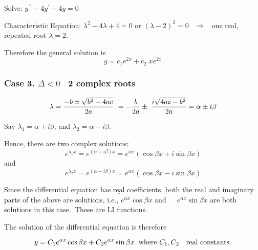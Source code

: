   \begin{frame}
 \begin{example}
 Solve:  $y^{\prime \prime }-4y^{\prime }+4y=0$
 \end{example}
 
 Characteristic Equation: $\lambda ^{2}-4\lambda +4=0$ \pause  or $(\lambda -2)^{2}=0$ \ \pause  $%
 \Rightarrow $ \ one real, repeated root $\lambda =2$. \pause 
 
Therefore the general solution is
 \begin{equation*}
 \ y=c_{1}e^{2x}+c_{2}\;xe^{2x}.
 \end{equation*}
 
 \end{frame}
 
 
 
 \begin{frame} 
\frametitle{Case 3. $\Delta <0$ \ 2 complex roots} 
 
 \begin{equation*}
 \lambda =\frac{-b\pm \sqrt{b^{2}-4ac}}{2a}\ =-\frac{b}{2a}\pm \;\frac{i\sqrt{%
 4ac-b^{2}}}{2a} = \alpha \pm i\beta 
 \end{equation*}
 
Say $ \lambda_1=\alpha + i \beta$, and  $ \lambda_2=\alpha - i \beta$.
\\ \vsp 
 
Hence, there are two complex solutions: \\
 \[e^{\lambda_1x} =e^{(\alpha +i\beta )x} =e^{\alpha x}(\cos \beta x+i\sin \beta x)\] 
 and 
 \[
e^{\lambda_2x} = e^{(\alpha -i\beta
  )x}=e^{\alpha x}(\cos \beta x-i\sin \beta x)
 \]
\pause
 
 Since the differential equation has $\underline{\text{real}}$ coefficients, both the real and imaginary parts of the above are solutions, i.e.,
  $e^{\alpha x}\cos \beta x$ and\ \ \ $e^{\alpha x}\sin \beta x$ are both
  solutions in this case.\ These are LI functions.
   \end{frame}
  
  
  
  \begin{frame}
 
 
 The solution of the differential equation is therefore
 
 \begin{equation*}
 y=C_1e^{\alpha x}\cos \beta x+C_2e^{\alpha x}\sin \beta x \;\text{\ where }C_1,C_2\text{ \ \
 real constants.}
 \end{equation*}
 
 \vspace{1pt}
  \end{frame}
  
